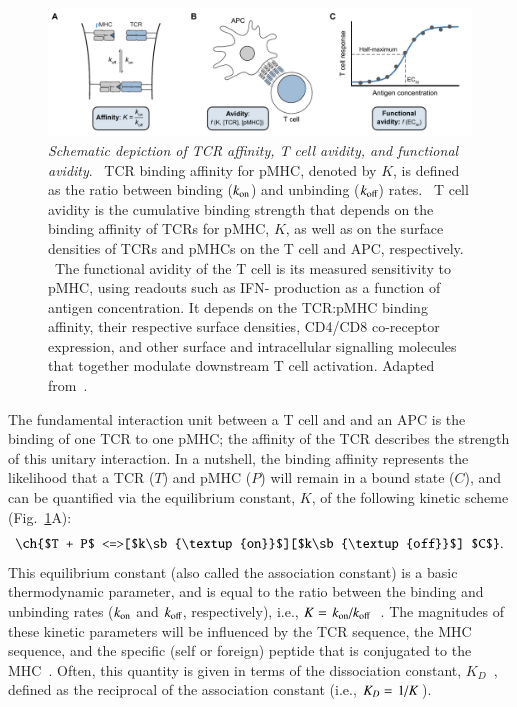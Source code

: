 \begin{figure}[tb]
    \centering
    \includegraphics[width=\textwidth]{Figures/intro/fig6_affinityVsAvidity.pdf}
    \caption[Schematic depiction of TCR affinity, T cell avidity, and functional avidity]{%
    \textit{Schematic depiction of TCR affinity, T cell avidity, and functional avidity}. %
    ~TCR binding affinity for pMHC, denoted by $K$, is defined as the ratio between binding ($k_{\textup{on}}$) and unbinding ($k_{\textup{off}}$) rates. %
    ~T cell avidity is the cumulative binding strength that depends on the binding affinity of TCRs for pMHC, $K$, as well as on the surface densities of TCRs and pMHCs on the T cell and APC, respectively. %
    ~The functional avidity of the T cell is its measured sensitivity to pMHC, using readouts such as IFN-\textgamma{} production as a function of antigen concentration. It depends on the TCR:pMHC binding affinity, their respective surface densities, CD4/CD8 co-receptor expression, and other surface and intracellular signalling molecules that together modulate downstream T cell activation. Adapted from~\cite{this2021strength}.}
    \label{fig:intro_affinityVsAvidity}
\end{figure}

The fundamental interaction unit between a T cell and and an APC is the binding of one TCR to one pMHC; the  affinity of the TCR describes the strength of this unitary interaction. In a nutshell, the binding affinity represents the likelihood that a TCR ($T$) and pMHC ($P$) will remain in a bound state ($C$), and can be quantified via the equilibrium constant, $K$, of the following kinetic scheme (Fig.~\ref{fig:intro_affinityVsAvidity}A):
%
\begin{equation}
    \ch{$T + P$ <=>[$k\sb{\textup{on}}$][$k\sb{\textup{off}}$] $C$}.
\end{equation}
%
This equilibrium constant (also called the association constant) is a basic thermodynamic parameter, and is equal to the ratio between the binding and unbinding rates ($k_{\textup{on}}$ and $k_{\textup{off}}$, respectively), i.e., $K = \flatfrac{k_{\textup{on}}}{k_{\textup{off}}}$~\cite{stone2013role,margulies2001tcr}. The magnitudes of these kinetic parameters will be influenced by the TCR sequence, the MHC sequence, and the specific (self or foreign) peptide that is conjugated to the MHC~\cite{this2021strength}. Often, this quantity is given in terms of the dissociation constant, $K_D$~\cite{margulies2001tcr,martinez2015lower}, defined as the reciprocal of the association constant (i.e., $K_D = \flatfrac{1}{K}$).

